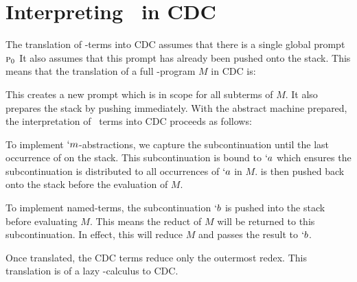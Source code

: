 
\section{Interpreting \lmu\ in CDC}\label{sec:lmu-in-cdc}


The translation of \lmu-terms into CDC assumes that there is a single global prompt $\textsc{p}_0$ 
It also assumes that this prompt has already been pushed onto the stack.
This means that the translation of a full \lmu-program $M$ in CDC is:

This creates a new prompt \gp which is in scope for all subterms of $M$.
It also prepares the stack by pushing \gp immediately. 
With the abstract machine prepared, 
the interpretation of \lmu\ terms into CDC proceeds as follows:


To implement $`m$-abstractions, we capture the subcontinuation until the last occurrence of \gp on the stack.
This subcontinuation is bound to $`a$ which ensures the subcontinuation is distributed to all occurrences of $`a$ in $M$.
\gp is then pushed back onto the stack before the evaluation of $M$.

To implement named-terms, the subcontinuation $`b$ is pushed into the stack before evaluating $M$.
This means the reduct of $M$ will be returned to this subcontinuation.
In effect, this will reduce $M$ and passes the result to $`b$.

Once translated, the CDC terms reduce only the outermost redex.
This translation is of a lazy \lmu-calculus to CDC.

